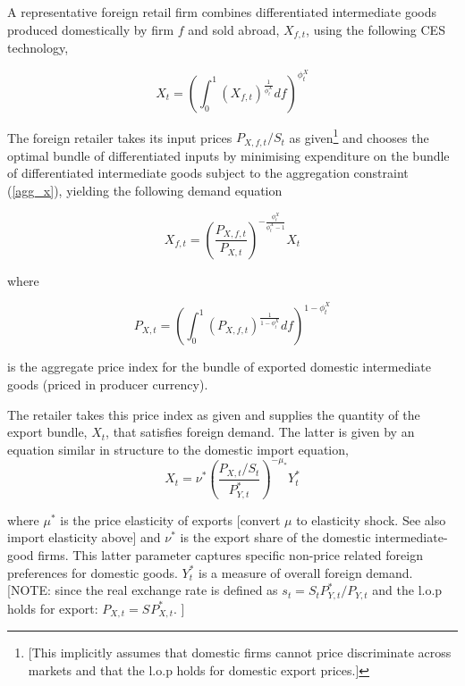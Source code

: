 \documentclass[a4paper,11pt]{article}
\numberwithin{equation}{section}
\begin{document}
	A representative foreign retail firm combines differentiated intermediate goods produced domestically by firm $f$ and sold abroad, $X_{f,t}$, using the following CES technology,
	
	\begin{equation} \label{agg_x}
	X_t=\left(\int_{0}^{1}\left(X_{f,t}\right)^{\frac{1}{\phi_t^X}}df\right)^{\phi_t^X}
	\end{equation}
	
	The foreign retailer takes its input prices $P_{X,f,t}/S_t$ as given\footnote{{\color{red}[This implicitly assumes that domestic firms cannot price discriminate across markets and that the l.o.p holds for domestic export prices.]}} and chooses the optimal bundle of differentiated inputs by minimising expenditure on the bundle of differentiated intermediate goods subject to the aggregation constraint (\ref{agg_x}), yielding the following demand equation
	
	\begin{equation}
	X_{f,t}=\left(\frac{P_{X,f,t}}{P_{X,t}}\right)^{-\frac{\phi_t^X}{\phi_t^X-1}}X_t
	\end{equation}
	
	where 
	
	\begin{equation}
	P_{X,t}=\left(\int_{0}^{1}\left(P_{X,f,t}\right)^{\frac{1}{1-\phi_t^X}}df\right)^{1-\phi_t^X}
	\end{equation}
	
	is the aggregate price index for the bundle of exported domestic intermediate goods (priced in producer currency).
	
	The retailer takes this price index as given and supplies the quantity of the export bundle, $X_t$, that satisfies foreign demand. The latter is given by an equation similar in structure to the domestic import equation,
	{\color{red}
	\begin{equation} \label{agg_export}
	X_t=\nu^*\left(\frac{P_{X,t}/S_t}{P_{Y,t}^{*}}\right)^{-\mu_*}Y_t^{*}
	\end{equation}
	}
	
	where {\color{red} $\mu^*$ is the price elasticity of exports 	[convert $\mu$ to elasticity shock. See also import elasticity above]} and $\nu^*$ is the export share of the domestic intermediate-good firms. This latter parameter captures specific non-price related foreign preferences for domestic goods. $Y_t^{*}$ is a measure of overall foreign demand. {\color{red}[NOTE: since the real exchange rate is defined as $s_t = S_{t}P^*_{Y,t}/P_{Y,t}$ and the l.o.p holds for export: $P_{X,t}=S_{}P_{X,t}^*$. ] }
	
\end{document}
